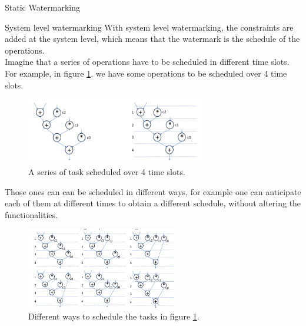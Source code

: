 \begin{section}{Static Watermarking}
  \begin{subsection}{System level watermarking}
    With system level watermarking, the constraints are added at the system level, which means that
    the watermark is the schedule of the operations.\\ 
    Imagine that a series of operations have to be scheduled in different time slots. For example, in
    figure \ref{fig:syslevelwm}, we have some operations to be scheduled over 4 time slots.
    \begin{figure}[H]
      \centering
      \includegraphics[width=0.7\textwidth]{img/hardware/system level watermarking.png}
      \caption{A series of task scheduled over 4 time slots.}
      \label{fig:syslevelwm}
    \end{figure}
    Those ones can can be scheduled in different ways, for example one can anticipate each of them 
    at different times to obtain a different schedule, without altering the functionalities.\\
    \begin{figure}[H]
      \centering
      \includegraphics[width=0.6\textwidth]{img/hardware/system level watermarking 2.png}
      \caption{Different ways to schedule the tasks in figure \ref{fig:syslevelwm}.}
      \label{fig:syslevelwm2}
    \end{figure}
  \end{subsection}
  

\end{section}
